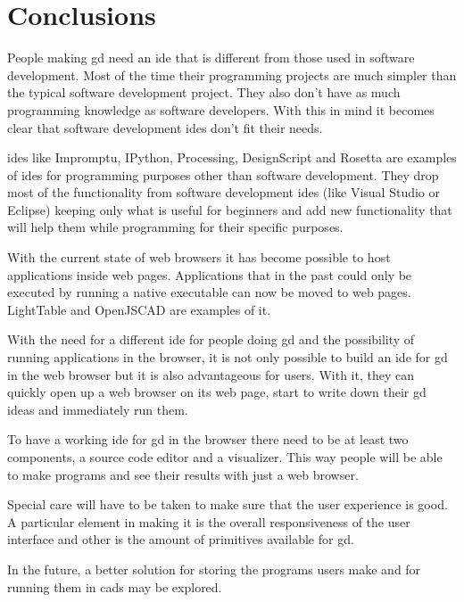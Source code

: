 \documentclass{./llncs2e/llncs}
\begin{document}
	

\section{Conclusions}
	People making \ac{gd} need an \ac{ide} that is different from those used in software development. 
	Most of the time their programming projects are much simpler than the typical software development project.
	They also don't have as much programming knowledge as software developers.
	With this in mind it becomes clear that software development \ac{ide}s don't fit their needs.
	
	\ac{ide}s like Impromptu, IPython, Processing, DesignScript and Rosetta are examples of \ac{ide}s for programming purposes other than software development.
	They drop most of the functionality from software development \ac{ide}s (like Visual Studio or Eclipse) keeping only what is useful for beginners and add new functionality that will help them while programming for their specific purposes.
	
	With the current state of web browsers it has become possible to host applications inside web pages. 
	Applications that in the past could only be executed by running a native executable can now be moved to web pages.
	LightTable and OpenJSCAD are examples of it.
	
	With the need for a different \ac{ide} for people doing \ac{gd} and the possibility of running applications in the browser, it is not only possible to build an \ac{ide} for \ac{gd} in the web browser but it is also advantageous for users.
	With it, they can quickly open up a web browser on its web page, start to write down their \ac{gd} ideas and immediately run them.
	
	To have a working \ac{ide} for \ac{gd} in the browser there need to be at least two components, a source code editor and a visualizer.
	This way people will be able to make programs and see their results with just a web browser.
	
	Special care will have to be taken to make sure that the user experience is good. 
	A particular element in making it is the overall responsiveness of the user interface and other is the amount of primitives available for \ac{gd}.
	
	In the future, a better solution for storing the programs users make and for running them in \ac{cad}s may be explored.
	
\newpage
\appendix
\end{document}
